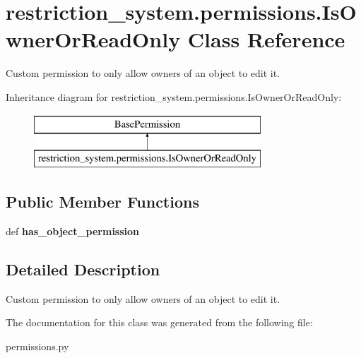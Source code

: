 \hypertarget{classrestriction__system_1_1permissions_1_1IsOwnerOrReadOnly}{}\section{restriction\+\_\+system.\+permissions.\+Is\+Owner\+Or\+Read\+Only Class Reference}
\label{classrestriction__system_1_1permissions_1_1IsOwnerOrReadOnly}


Custom permission to only allow owners of an object to edit it.  


Inheritance diagram for restriction\+\_\+system.\+permissions.\+Is\+Owner\+Or\+Read\+Only\+:\begin{figure}[H]
\begin{center}
\leavevmode
\includegraphics[height=2.000000cm]{classrestriction__system_1_1permissions_1_1IsOwnerOrReadOnly}
\end{center}
\end{figure}
\subsection*{Public Member Functions}
\begin{DoxyCompactItemize}
\item 
\hypertarget{classrestriction__system_1_1permissions_1_1IsOwnerOrReadOnly_a5451c6079340141a4ac71102809bdbd5}{}def {\bfseries has\+\_\+object\+\_\+permission}\label{classrestriction__system_1_1permissions_1_1IsOwnerOrReadOnly_a5451c6079340141a4ac71102809bdbd5}

\end{DoxyCompactItemize}


\subsection{Detailed Description}
Custom permission to only allow owners of an object to edit it. 



The documentation for this class was generated from the following file\+:\begin{DoxyCompactItemize}
\item 
permissions.\+py\end{DoxyCompactItemize}
